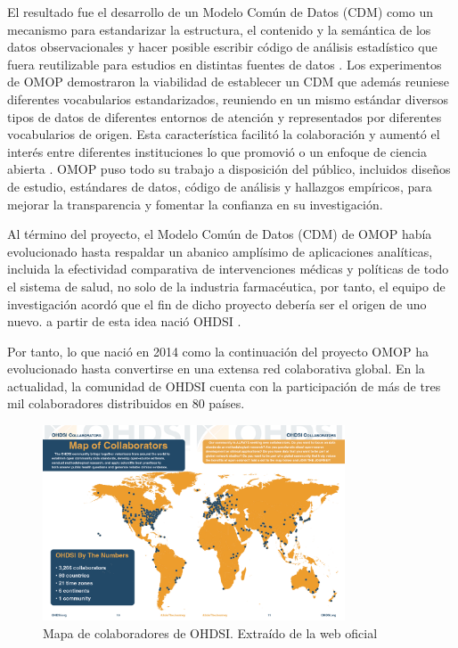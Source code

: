El resultado fue el desarrollo de un Modelo Común de Datos (CDM) como un mecanismo para estandarizar la estructura, el contenido y la semántica de los datos observacionales y hacer posible escribir código de análisis estadístico que fuera reutilizable para estudios en distintas fuentes de datos \cite{overhage2012validation}. Los experimentos de OMOP demostraron la viabilidad de establecer un CDM que además reuniese diferentes vocabularios estandarizados, reuniendo en un mismo estándar diversos tipos de datos de diferentes entornos de atención y representados por diferentes vocabularios de origen. Esta característica facilitó la colaboración y aumentó el interés entre diferentes instituciones lo que promovió o un enfoque de ciencia abierta \cite{OHDSIbook}. OMOP puso todo su trabajo a disposición del público, incluidos diseños de estudio, estándares de datos, código de análisis y hallazgos empíricos, para mejorar la transparencia y fomentar la confianza en su investigación. 

Al término del proyecto, el Modelo Común de Datos (CDM) de OMOP había evolucionado hasta respaldar un abanico  amplísimo de aplicaciones analíticas, incluida la efectividad comparativa de intervenciones médicas y políticas de todo el sistema de salud, no solo de la industria farmacéutica, por tanto, el equipo de investigación acordó que el fin de dicho proyecto debería ser el origen de uno nuevo. a partir de esta idea nació OHDSI \cite{OHDSIbook}.


Por tanto, lo que nació en 2014 como la continuación del proyecto OMOP ha evolucionado hasta convertirse en una extensa red colaborativa global.  En la actualidad, la comunidad de OHDSI cuenta con la participación de más de tres mil colaboradores distribuidos en 80 países.

\begin{figure}[H]
    \centering
    \includegraphics[width=0.80\textwidth]{figures/OHDSIcollaborators.png}
     \caption{Mapa de colaboradores de OHDSI. Extraído de la web oficial \cite{OHDSIwebsite}}
    \label{fig:OHDSIcollaborators}
\end{figure}

